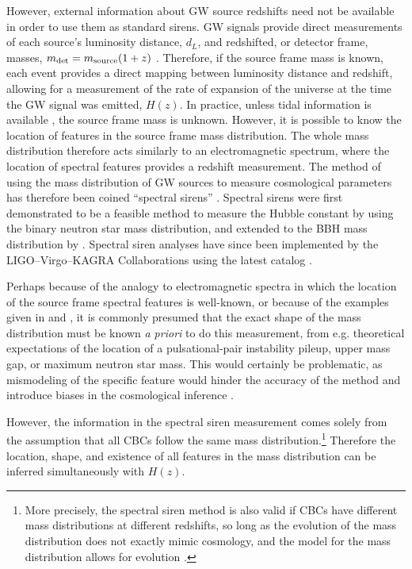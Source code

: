 \documentclass[]{aastex631}
\begin{document}
However, external information about \ac{GW} source redshifts need not be available in order to use them as standard sirens.
\ac{GW} signals provide direct measurements of each source's luminosity distance, $d_L$, and redshifted, or detector frame, masses, $m_{\det}= m_{\text{source}}(1+z)$ \citep[e.g.][]{chen_mass-redshift_2019}.
Therefore, if the source frame mass is known, each event provides a direct mapping between luminosity distance and redshift, allowing for a measurement of the rate of expansion of the universe at the time the \ac{GW} signal was emitted, $H(z)$.
In practice, unless tidal information is available \citep{messenger_measuring_2012}, the source frame mass is unknown.
However, it is possible to know the location of features in the source frame mass distribution.
The whole mass distribution therefore acts similarly to an electromagnetic spectrum, where the location of spectral features provides a redshift measurement.
The method of using the mass distribution of \ac{GW} sources to measure cosmological parameters has therefore been coined ``spectral sirens'' \citep{ezquiaga_spectral_2022}.
Spectral sirens were first demonstrated to be a feasible method to measure the Hubble constant by \cite{chernoff_gravitational_1993,Taylor:2011fs} using the binary neutron star mass distribution, and extended to the \ac{BBH} mass distribution by \cite{farr_future_2019}. 
Spectral siren analyses have since been implemented by the LIGO--Virgo--KAGRA Collaborations using the latest catalog \cite{gwtc3_cosmo}.

Perhaps because of the analogy to electromagnetic spectra in which the location of the source frame spectral features is well-known, or because of the examples given in \cite{farr_future_2019} and \cite{chernoff_gravitational_1993}, it is commonly presumed that the exact shape of the mass distribution must be known \emph{a priori} to do this measurement, from e.g. theoretical expectations of the location of a pulsational-pair instability pileup, upper mass gap, or maximum neutron star mass. 
This would certainly be problematic, as mismodeling of the specific feature would hinder the accuracy of the method and introduce biases in the cosmological inference \citep{Mukherjee:2021rtw,mastrogiovanni_importance_2021,pierra_study_2023}.

However, the information in the spectral siren measurement comes solely from the assumption that all \acp{CBC} follow the same mass distribution.\footnote{More precisely, the spectral siren method is also valid if \acp{CBC} have different mass distributions at different redshifts, so long as the evolution of the mass distribution does not exactly mimic cosmology, and the model for the mass distribution allows for evolution \citep{ezquiaga_spectral_2022}. 
}
Therefore the location, shape, and existence of all features in the mass distribution can be inferred simultaneously with $H(z)$. 
\end{document}
